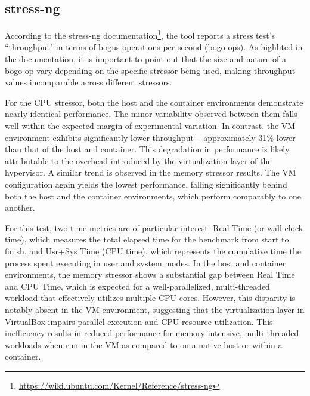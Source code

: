 \subsection{stress-ng}

According to the stress-ng documentation\footnote{\url{https://wiki.ubuntu.com/Kernel/Reference/stress-ng}}, the tool reports a stress test's ``throughput" in terms of bogus operations per second (bogo-ops). As highlited in the documentation, it is important to point out that the size and nature of a bogo-op vary depending on the specific stressor being used, making throughput values incomparable across different stressors.

For the CPU stressor, both the host and the container environments demonstrate nearly identical performance. The minor variability observed between them falls well within the expected margin of experimental variation. In contrast, the VM environment exhibits significantly lower throughput -- approximately 31\% lower than that of the host and container. This degradation in performance is likely attributable to the overhead introduced by the virtualization layer of the hypervisor. A similar trend is observed in the memory stressor results. The VM configuration again yields the lowest performance, falling significantly behind both the host and the container environments, which perform comparably to one another.

For this test, two time metrics are of particular interest: Real Time (or wall-clock time), which measures the total elapsed time for the benchmark from start to finish, and Usr+Sys Time (CPU time), which represents the cumulative time the process spent executing in user and system modes. In the host and container environments, the memory stressor shows a substantial gap between Real Time and CPU Time, which is expected for a well-parallelized, multi-threaded workload that effectively utilizes multiple CPU cores. However, this disparity is notably absent in the VM environment, suggesting that the virtualization layer in VirtualBox impairs parallel execution and CPU resource utilization. This inefficiency results in reduced performance for memory-intensive, multi-threaded workloads when run in the VM as compared to on a native host or within a container.

